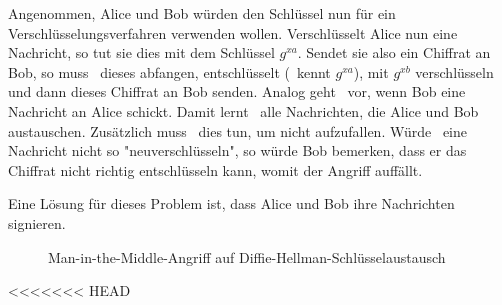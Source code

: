 Angenommen, Alice und Bob würden den Schlüssel nun für ein
Verschlüsselungsverfahren verwenden wollen. Verschlüsselt Alice nun eine
Nachricht, so tut sie dies mit dem Schlüssel $g^{xa}$. Sendet sie also ein
Chiffrat an Bob, so muss \A~dieses abfangen, entschlüsselt (\A~kennt
$g^{xa}$), mit $g^{xb}$ verschlüsseln und dann dieses Chiffrat an Bob
senden. Analog geht \A~vor, wenn Bob eine Nachricht an Alice
schickt. Damit lernt \A~alle Nachrichten, die Alice und Bob
austauschen. Zusätzlich muss \A~dies tun, um nicht aufzufallen. Würde
\A~eine Nachricht nicht so "neuverschlüsseln", so würde Bob bemerken,
dass er das Chiffrat nicht richtig entschlüsseln kann, womit der Angriff
auffällt.

Eine Lösung für dieses Problem ist, dass Alice und Bob ihre Nachrichten
signieren.
\begin{figure}[h]
  \begin{center}
  \end{center}

  \caption{Man-in-the-Middle-Angriff auf Diffie-Hellman-Schlüsselaustausch}
  \label{fig:keyex:dh-angriff}    
\end{figure}
<<<<<<< HEAD
